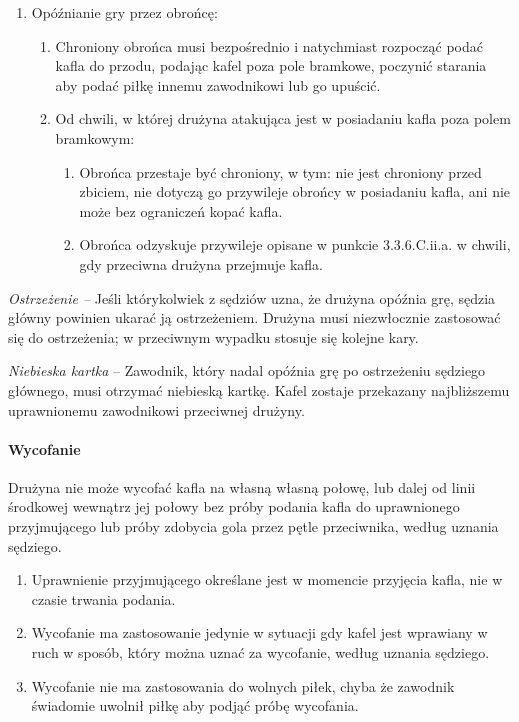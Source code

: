 \documentclass[12pt]{article}
\begin{document}
\begin{enumerate}
\item Opóźnianie gry przez obrońcę:
\begin{enumerate}
\item Chroniony obrońca musi bezpośrednio i natychmiast rozpocząć podać
kafla do przodu, podając kafel poza pole bramkowe, poczynić starania aby
podać piłkę innemu zawodnikowi lub go upuścić.

\item Od chwili, w której drużyna atakująca jest w posiadaniu kafla poza
polem bramkowym:
\begin{enumerate}
\item Obrońca przestaje być chroniony, w tym: nie jest chroniony przed
zbiciem, nie dotyczą go przywileje obrońcy w posiadaniu kafla, ani nie
może bez ograniczeń kopać kafla.

\item Obrońca odzyskuje przywileje opisane w punkcie 3.3.6.C.ii.a.
w chwili, gdy przeciwna drużyna przejmuje kafla.
\end{enumerate}
\end{enumerate}
\end{enumerate}

\emph{Ostrzeżenie --} Jeśli którykolwiek z sędziów uzna, że drużyna
opóźnia grę, sędzia główny powinien ukarać ją ostrzeżeniem. Drużyna musi
niezwłocznie zastosować się do ostrzeżenia; w przeciwnym wypadku stosuje
się kolejne kary.

\emph{Niebieska kartka} -- Zawodnik, który nadal opóźnia grę po
ostrzeżeniu sędziego głównego, musi otrzymać niebieską kartkę. Kafel
zostaje przekazany najbliższemu uprawnionemu zawodnikowi przeciwnej
drużyny.

\paragraph{Wycofanie}
Drużyna nie może wycofać kafla na własną
własną połowę, lub dalej od linii środkowej wewnątrz jej połowy bez
próby podania kafla do uprawnionego przyjmującego lub próby zdobycia
gola przez pętle przeciwnika, według uznania sędziego.

\begin{enumerate}
\item
    Uprawnienie przyjmującego określane jest w momencie przyjęcia kafla,
  nie w czasie trwania podania.
  \item
    Wycofanie ma zastosowanie jedynie w sytuacji gdy kafel jest wprawiany
  w ruch w sposób, który można uznać za wycofanie, według uznania
  sędziego.
  \item
    Wycofanie nie ma zastosowania do wolnych piłek, chyba że zawodnik
  świadomie uwolnił piłkę aby podjąć próbę wycofania.
  \end{enumerate}
\end{document}
